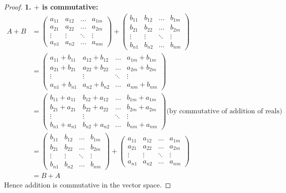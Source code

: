 \documentclass{article}
\begin{document}
\begin{proof}
\textbf{1. $+$ is commutative:}
\begin{align*}
A + B &= \begin{pmatrix} a_{11} & a_{12} & \ldots & a_{1m} \\ a_{21} & a_{22} & \ldots  & a_{2m} \\ \vdots & \vdots & \ddots & \vdots \\ a_{n1} & a_{n2} & \ldots & a_{nm} \end{pmatrix} +  \begin{pmatrix} b_{11} & b_{12} & \ldots & b_{1m} \\ b_{21} & b_{22} & \ldots  & b_{2m} \\ \vdots & \vdots & \ddots & \vdots \\ b_{n1} & b_{n2} & \ldots & b_{nm} \end{pmatrix} \\
&= \begin{pmatrix} a_{11} + b_{11} & a_{12} + b_{12} & \ldots & a_{1m} + b_{1m} \\ a_{21} + b_{21} & a_{22} + b_{22} & \ldots  & a_{2m} + b_{2m} \\ \vdots & \vdots & \ddots & \vdots \\ a_{n1} + b_{n1} & a_{n2} +  b_{n2} & \ldots & a_{nm} + b_{nm} \end{pmatrix} \\
&= \begin{pmatrix} b_{11} + a_{11} & b_{12} + a_{12} & \ldots & b_{1m} + a_{1m} \\ b_{21} + a_{21} & b_{22} + a_{22} & \ldots  & b_{2m} + a_{2m} \\ \vdots & \vdots & \ddots & \vdots \\ b_{n1} + a_{n1} & b_{n2} + a_{n2} & \ldots & b_{nm} + a_{nm} \end{pmatrix} \text{(by commutative of addition of reals)} \\
&=  \begin{pmatrix} b_{11} & b_{12} & \ldots & b_{1m} \\ b_{21} & b_{22} & \ldots  & b_{2m} \\ \vdots & \vdots & \ddots & \vdots \\ b_{n1} & b_{n2} & \ldots & b_{nm} \end{pmatrix} + \begin{pmatrix} a_{11} & a_{12} & \ldots & a_{1m} \\ a_{21} & a_{22} & \ldots  & a_{2m} \\ \vdots & \vdots & \ddots & \vdots \\ a_{n1} & a_{n2} & \ldots & a_{nm} \end{pmatrix} \\
&= B+ A
\end{align*}
Hence addition is commutative in the vector space.
\smallskip


\end{proof}
\end{document}
